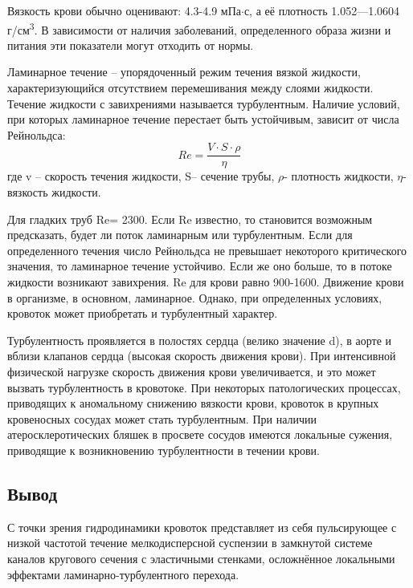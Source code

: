 Вязкость крови обычно оценивают: 4.3-4.9 мПа$\cdot$с, а её плотность 1.052—1.0604 г/см\textsuperscript{3}. В зависимости от наличия заболеваний, определенного образа жизни и питания эти показатели могут отходить от нормы. 

Ламинарное течение – упорядоченный режим течения вязкой жидкости, характеризующийся отсутствием перемешивания между слоями жидкости. Течение жидкости с завихрениями называется турбулентным. 
Наличие условий, при которых ламинарное течение перестает быть устойчивым, зависит от числа Рейнольдса:
$$Re=\frac{V\cdot S\cdot \rho}{\eta}$$
где v – скорость течения жидкости, S– сечение трубы, $\rho$- плотность жидкости, $\eta$- вязкость жидкости.

Для гладких труб Re= 2300. Если Re известно, то становится возможным предсказать, будет ли поток ламинарным или турбулентным. Если для определенного течения число Рейнольдса не превышает некоторого критического значения, то ламинарное течение устойчиво. Если же оно больше, то в потоке жидкости возникают завихрения. Re для крови равно 900-1600. Движение крови в организме, в основном, ламинарное. Однако, при определенных условиях, кровоток может приобретать и турбулентный характер.

Турбулентность проявляется в полостях сердца (велико значение d), в аорте и вблизи клапанов сердца (высокая скорость движения крови). При интенсивной физической нагрузке скорость движения крови увеличивается, и это может вызвать турбулентность в кровотоке. При некоторых патологических процессах, приводящих к аномальному снижению вязкости крови, кровоток в крупных кровеносных сосудах может стать турбулентным.  При наличии атеросклеротических бляшек в просвете сосудов имеются локальные сужения, приводящие к возникновению турбулентности в течении крови. 

\subsection{Вывод}
 С точки зрения гидродинамики кровоток представляет из себя пульсирующее с низкой частотой течение мелкодисперсной суспензии в замкнутой системе каналов кругового сечения с эластичными стенками, осложнённое локальными эффектами ламинарно-турбулентного перехода.
